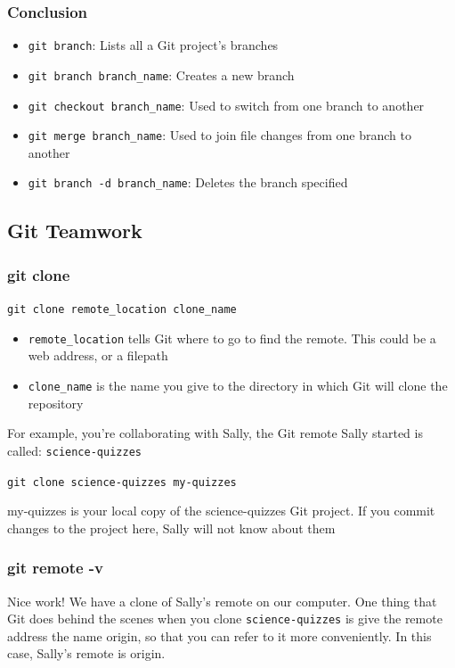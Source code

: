 \documentclass[a4paper, 12pt]{article}
\begin{document}
\subsubsection{Conclusion}
\begin{itemize}
\item \verb|git branch|: Lists all a Git project's branches

\item \verb|git branch branch_name|: Creates a new branch

\item \verb|git checkout branch_name|: Used to switch from one branch to another

\item \verb|git merge branch_name|: Used to join file changes from one branch to another

\item \verb|git branch -d branch_name|: Deletes the branch specified

\end{itemize}

\subsection{Git Teamwork}
\subsubsection{git clone}
\verb|git clone remote_location clone_name|

\begin{itemize}
\item \verb|remote_location| tells Git where to go to find the remote. This could be a web address, or a filepath

\item \verb|clone_name| is the name you give to the directory in which Git will clone the repository

\end{itemize}

For example, you're collaborating with Sally, the Git remote Sally started is called: \verb|science-quizzes|

\verb|git clone science-quizzes my-quizzes| 

my-quizzes is your local copy of the science-quizzes Git project. If you commit changes to the project here, Sally will not know about them

\subsubsection{git remote -v}
Nice work! We have a clone of Sally's remote on our computer. One thing that Git does behind the scenes when you clone \verb|science-quizzes| is give the remote address the name origin, so that you can refer to it more conveniently. In this case, Sally's remote is origin.
\end{document}
